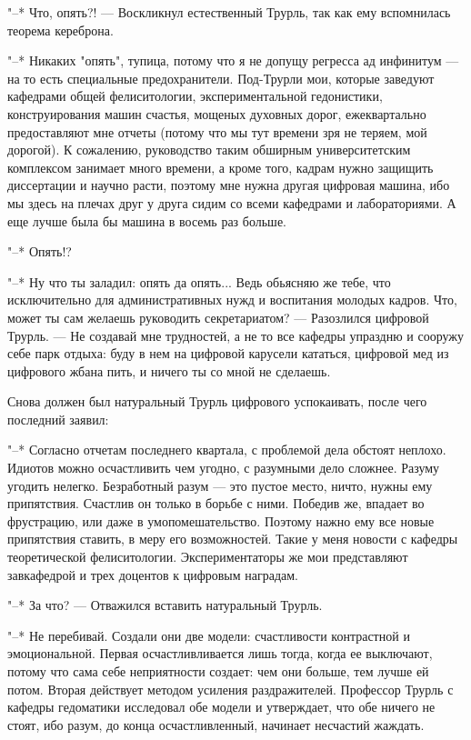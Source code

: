 "--* Что, опять?! --- Воскликнул естественный Трурль, так
как ему вспомнилась теорема кереброна.

"--* Никаких "опять", тупица, потому что я не допущу
регресса ад инфинитум --- на то есть специальные
предохранители. Под-Трурли мои, которые заведуют кафедрами
общей фелиситологии, экспериментальной гедонистики,
конструирования машин счастья, мощеных духовных дорог,
ежеквартально предоставляют мне отчеты (потому что мы тут
времени зря не теряем, мой дорогой). К сожалению,
руководство таким обширным университетским комплексом
занимает много времени, а кроме того, кадрам нужно защищить
диссертации и научно расти, поэтому мне нужна другая
цифровая машина, ибо мы здесь на плечах друг у друга сидим
со всеми кафедрами и лабораториями. А еще лучше была бы
машина в восемь раз больше.

"--* Опять!?

"--* Ну что ты заладил: опять да опять... Ведь обьясняю же
тебе, что исключительно для административных нужд и
воспитания молодых кадров. Что, может ты сам желаешь
руководить секретариатом? --- Разозлился цифровой Трурль. --- Не
создавай мне трудностей, а не то все кафедры упраздню и
сооружу себе парк отдыха: буду в нем на цифровой карусели
кататься, цифровой мед из цифрового жбана пить, и ничего ты
со мной не сделаешь.

Снова должен был натуральный Трурль цифрового
успокаивать, после чего последний заявил:

"--* Согласно отчетам последнего квартала, с проблемой дела
обстоят неплохо. Идиотов можно осчастливить чем угодно, с
разумными дело сложнее. Разуму угодить нелегко. Безработный
разум --- это пустое место, ничто, нужны ему припятствия.
Счастлив он только в борьбе с ними. Победив же, впадает во
фрустрацию, или даже в умопомешательство. Поэтому нажно ему
все новые припятствия ставить, в меру его возможностей.
Такие у меня новости с кафедры теоретической фелиситологии.
Экспериментаторы же мои представляют завкафедрой и трех
доцентов к цифровым наградам.

"--* За что? --- Отважился вставить натуральный Трурль.

"--* Не перебивай. Создали они две модели: счастливости
контрастной и эмоциональной. Первая осчастливливается лишь
тогда, когда ее выключают, потому что сама себе неприятности
создает: чем они больше, тем лучше ей потом. Вторая
действует методом усиления раздражителей. Профессор Трурль
с кафедры гедоматики исследовал обе модели и утверждает,
что обе ничего не стоят, ибо разум, до конца
осчастливленный, начинает несчастий жаждать.

